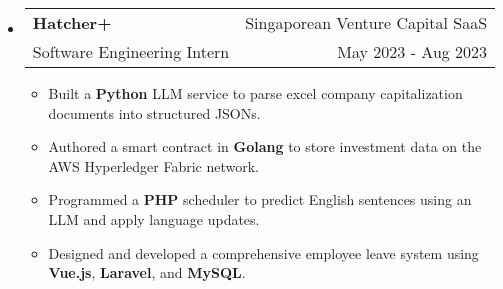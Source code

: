 \documentclass[letterpaper, 11pt]{article}
\makeatletter
\newcommand{\ResumeEntryTSDL}[4]{
  \vspace{1pt}\item
    \begin{tabular*}{\textwidth}[t]{l@{\extracolsep{\fill}}r} 
      \textbf{#1} & #2 \\
      #3 & #4 \\
    \end{tabular*}\vspace{-2.835pt} %
}
\newcommand{\ResumeItem}[2]{
  \item{
    \textbf{#1}{: #2 \vspace{-2.835pt}}
  }
}
\newcommand{\ResumeItemDefault}[1]{
  \item{
    #1 \vspace{-2.835pt}
  }
}
\newcommand{\ResumeEntryStart}{\begin{itemize}[leftmargin=0mm, label={}]}
\newcommand{\ResumeEntryEnd}{\end{itemize}\vspace{-2.835pt}} %
\newcommand{\ResumeItemListStart}{\begin{itemize}[leftmargin=5mm, label=$\bullet$, itemsep=1mm, parsep=1mm]} %
\newcommand{\ResumeItemListEnd}{\end{itemize}}
\makeatother
\begin{document}
  \ResumeEntryStart
    \ResumeEntryTSDL{Hatcher+}{Singaporean Venture Capital SaaS}{Software Engineering Intern}{May 2023 - Aug 2023}
    \ResumeItemListStart
      \ResumeItemDefault{Built a \textbf{Python} LLM service to parse excel company capitalization documents into structured JSONs.}
      \ResumeItemDefault{Authored a smart contract in \textbf{Golang} to store investment data on the AWS Hyperledger Fabric network.}
      \ResumeItemDefault{Programmed a \textbf{PHP} scheduler to predict English sentences using an LLM and apply language updates.}
      \ResumeItemDefault{Designed and developed a comprehensive employee leave system using \textbf{Vue.js}, \textbf{Laravel}, and \textbf{MySQL}.}
    \ResumeItemListEnd
  \ResumeEntryEnd
\end{document}
